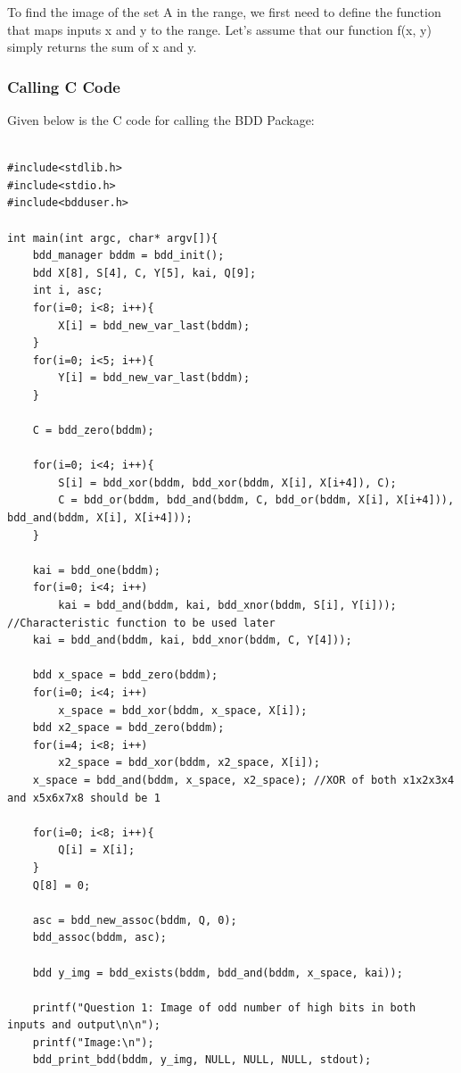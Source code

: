 \documentclass[12pt]{article}
\begin{document}
To find the image of the set A in the range, we first need to define the function that maps inputs x and y to the range. Let's assume that our function f(x, y) simply returns the sum of x and y.\\

\subsubsection{Calling C Code}
Given below is the C code for calling the BDD Package:\\
\begin{verbatim}

#include<stdlib.h>
#include<stdio.h>
#include<bdduser.h>

int main(int argc, char* argv[]){
	bdd_manager bddm = bdd_init();
	bdd X[8], S[4], C, Y[5], kai, Q[9];
	int i, asc;
	for(i=0; i<8; i++){
		X[i] = bdd_new_var_last(bddm);
	}
	for(i=0; i<5; i++){
		Y[i] = bdd_new_var_last(bddm);
	}

	C = bdd_zero(bddm);

	for(i=0; i<4; i++){
		S[i] = bdd_xor(bddm, bdd_xor(bddm, X[i], X[i+4]), C);
		C = bdd_or(bddm, bdd_and(bddm, C, bdd_or(bddm, X[i], X[i+4])), bdd_and(bddm, X[i], X[i+4]));
	}

	kai = bdd_one(bddm);
	for(i=0; i<4; i++)
		kai = bdd_and(bddm, kai, bdd_xnor(bddm, S[i], Y[i])); //Characteristic function to be used later
	kai = bdd_and(bddm, kai, bdd_xnor(bddm, C, Y[4]));
	
	bdd x_space = bdd_zero(bddm);
	for(i=0; i<4; i++)
		x_space = bdd_xor(bddm, x_space, X[i]);
	bdd x2_space = bdd_zero(bddm);
	for(i=4; i<8; i++)
		x2_space = bdd_xor(bddm, x2_space, X[i]);
	x_space = bdd_and(bddm, x_space, x2_space); //XOR of both x1x2x3x4 and x5x6x7x8 should be 1

	for(i=0; i<8; i++){
		Q[i] = X[i];
	}
	Q[8] = 0;

	asc = bdd_new_assoc(bddm, Q, 0);
	bdd_assoc(bddm, asc);

	bdd y_img = bdd_exists(bddm, bdd_and(bddm, x_space, kai));
	
	printf("Question 1: Image of odd number of high bits in both inputs and output\n\n");
	printf("Image:\n");
	bdd_print_bdd(bddm, y_img, NULL, NULL, NULL, stdout);
\end{verbatim}
\end{document}
